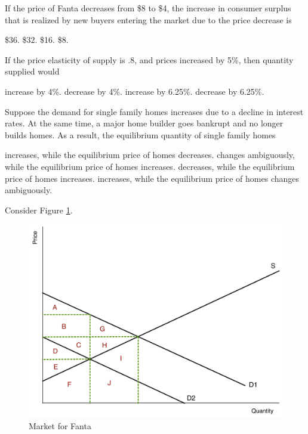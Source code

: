 \documentclass[addpoints,11pt]{exam}
\theoremstyle{definition}
\begin{document}
\begin{questions}
	If the price of Fanta decreases from \$8 to \$4, the increase in consumer surplus that is realized by new buyers entering the market due to the price decrease is 
	
	\begin{choices}
			\choice \$36.
			\choice \$32.
			\CorrectChoice \$16.
			\choice \$8.
	\end{choices}
	
	
	\question If the price elasticity of supply is .8, and prices increased by 5\%, then quantity supplied would
	


	\begin{choices}
		\CorrectChoice increase by 4\%.
		\choice decrease by 4\%.
		\choice increase by 6.25\%.
		\choice decrease by 6.25\%.
	\end{choices}

	
	\question Suppose the demand for single family homes increases due to a decline in interest rates. At the same time, a major home builder goes bankrupt and no longer builds homes. As a result, the equilibrium quantity of single family homes
	
	\begin{choices}
		\choice increases, while the equilibrium price of homes decreases.
		\CorrectChoice changes ambiguously, while the equilibrium price of homes increases. 
		\choice decreases, while the equilibrium price of homes increases.
		\choice increases, while the equilibrium price of homes changes ambiguously.
	\end{choices}
	
		
\question Consider Figure \ref{MC25}. 

\begin{figure}[H]
	\centering
	\includegraphics[scale=.40]{Exam1_MC25.pdf}
	\caption{Market for Fanta}
	\label{MC25}
\end{figure}


\end{questions}
\end{document}
